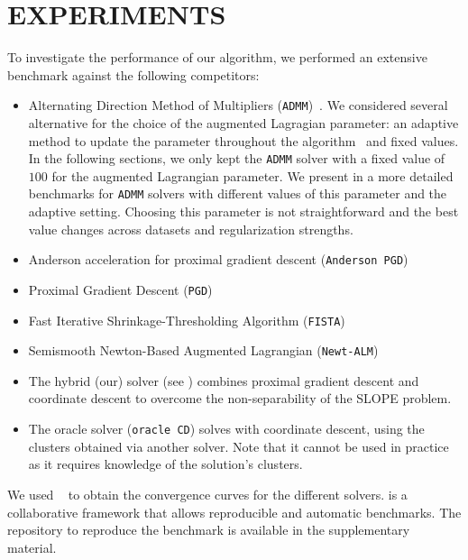 \section{EXPERIMENTS}\label{sec:experiments}

To investigate the performance of our algorithm, we performed an extensive benchmark against the following competitors:
\begin{itemize}[noitemsep]
  \item Alternating Direction Method of Multipliers (\texttt{ADMM})~\parencite{boyd2010}.
  We considered several alternative for the choice of the augmented Lagragian parameter: an adaptive method to update the parameter throughout the algorithm~\parencite[Sec. 3.4.1]{boyd2010} and fixed values.
  In the following sections, we only kept the \texttt{ADMM} solver with a fixed value of $100$ for the augmented Lagrangian parameter.
  We present in  a more detailed benchmarks for \texttt{ADMM} solvers with different values of this parameter and the adaptive setting.
  Choosing this parameter is not straightforward and the best value changes across datasets and regularization strengths.
  \item Anderson acceleration for proximal gradient descent (\texttt{Anderson PGD})~\parencite{zhang2020}
  \item Proximal Gradient Descent (\texttt{PGD})~\parencite{combettes2005}
  \item Fast Iterative Shrinkage-Thresholding Algorithm (\texttt{FISTA})~\parencite{beck2009}
  \item Semismooth Newton-Based Augmented Lagrangian (\texttt{Newt-ALM})~\parencite{Ziyan2019}

  \item The hybrid (our) solver (see ) combines proximal gradient descent
        and coordinate descent to overcome the non-separability of the SLOPE problem.
  \item The oracle solver (\texttt{oracle CD}) solves  with coordinate descent, using the clusters obtained via another solver.
  Note that it cannot be used in practice as it requires knowledge of the solution's clusters.
\end{itemize}

We used ~\parencite{moreau2022benchopt} to obtain the convergence curves for the different solvers.
 is a collaborative framework that allows reproducible and automatic benchmarks.
The repository to reproduce the benchmark is available in the supplementary material.

